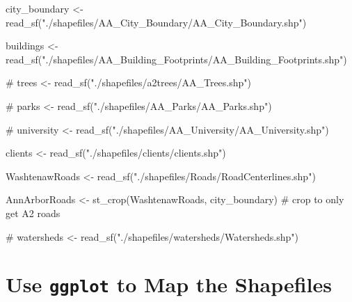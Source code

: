 \documentclass[
  letterpaper,
  DIV=11,
  numbers=noendperiod,
  oneside]{scrreprt}
\newenvironment{Shaded}{\begin{snugshade}}{\end{snugshade}}
\newcommand{\CommentTok}[1]{\textcolor[rgb]{0.37,0.37,0.37}{#1}}
\newcommand{\FunctionTok}[1]{\textcolor[rgb]{0.28,0.35,0.67}{#1}}
\newcommand{\NormalTok}[1]{\textcolor[rgb]{0.00,0.23,0.31}{#1}}
\newcommand{\OtherTok}[1]{\textcolor[rgb]{0.00,0.23,0.31}{#1}}
\newcommand{\StringTok}[1]{\textcolor[rgb]{0.13,0.47,0.30}{#1}}
\begin{document}
\begin{Shaded}
\begin{Highlighting}[]
\NormalTok{city\_boundary }\OtherTok{\textless{}{-}} \FunctionTok{read\_sf}\NormalTok{(}\StringTok{"./shapefiles/AA\_City\_Boundary/AA\_City\_Boundary.shp"}\NormalTok{)}

\NormalTok{buildings }\OtherTok{\textless{}{-}} \FunctionTok{read\_sf}\NormalTok{(}\StringTok{"./shapefiles/AA\_Building\_Footprints/AA\_Building\_Footprints.shp"}\NormalTok{)}

\CommentTok{\# trees \textless{}{-} read\_sf("./shapefiles/a2trees/AA\_Trees.shp")}

\CommentTok{\# parks \textless{}{-} read\_sf("./shapefiles/AA\_Parks/AA\_Parks.shp")}

\CommentTok{\# university \textless{}{-} read\_sf("./shapefiles/AA\_University/AA\_University.shp")}

\NormalTok{clients }\OtherTok{\textless{}{-}} \FunctionTok{read\_sf}\NormalTok{(}\StringTok{"./shapefiles/clients/clients.shp"}\NormalTok{)}

\NormalTok{WashtenawRoads }\OtherTok{\textless{}{-}} \FunctionTok{read\_sf}\NormalTok{(}\StringTok{"./shapefiles/Roads/RoadCenterlines.shp"}\NormalTok{)}

\NormalTok{AnnArborRoads }\OtherTok{\textless{}{-}} \FunctionTok{st\_crop}\NormalTok{(WashtenawRoads, }
\NormalTok{                         city\_boundary) }\CommentTok{\# crop to only get A2 roads}

\CommentTok{\# watersheds \textless{}{-} read\_sf("./shapefiles/watersheds/Watersheds.shp")}
\end{Highlighting}
\end{Shaded}

\section{\texorpdfstring{Use \texttt{ggplot} to Map the
Shapefiles}{Use ggplot to Map the Shapefiles}}\label{use-ggplot-to-map-the-shapefiles}
\end{document}
